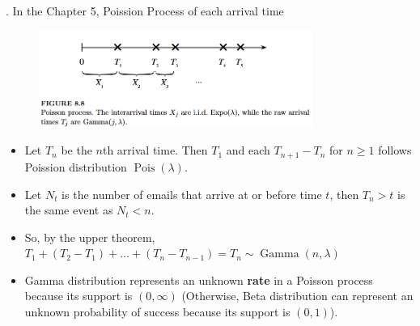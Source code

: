 \documentclass[8pt]{beamer}
\newcommand{\tb}[1]{\textbf{#1}}
\newcommand{\Pois}[1]{\operatorname{Pois}(#1)}
\newcommand{\GammaDist}[2]{\operatorname{Gamma}\!\left(#1, #2\right)}
\begin{document}
\begin{frame}{.}
    In the Chapter 5, Poission Process of each arrival time

    \begin{figure}
        \includegraphics[width=0.8\textwidth]{ExpoAndGamma.png}
    \end{figure}

    \begin{itemize}
        \item Let $T_n$ be the $n$th arrival time. Then $T_1$ and each $T_{n+1} - T_n$ for $n\geq 1$ follows Poission distribution $\Pois{\lambda}$.
        \item Let $N_t$ is the number of emails that arrive at or before time $t$, then $T_n > t$ is the same event as $N_t < n $.
        \item So, by the upper theorem, $T_1 + (T_2 - T_1) + \dots + (T_n - T_{n-1}) = T_n \sim \GammaDist{n}{\lambda}$
        \item Gamma distribution represents an unknown \tb{rate} in a Poisson process because its support is $(0, \infty)$ (Otherwise, Beta distribution can represent an unknown probability of success because its support is $(0,1)$).
    \end{itemize}

\end{frame}
\end{document}
